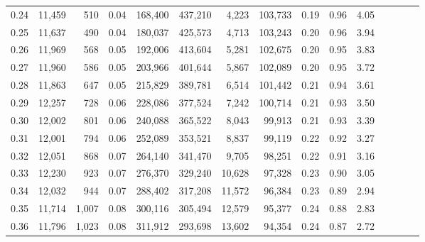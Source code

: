 \begin{tabular}{rrrcrrrrrrrrrrr}
0.24 &  11,459 &    510 &                                       0.04 &  168,400 &  437,210 &    4,223 &  103,733 &  0.19 &  0.96 &                         4.05 \\
0.25 &  11,637 &    490 &                                       0.04 &  180,037 &  425,573 &    4,713 &  103,243 &  0.20 &  0.96 &                         3.94 \\
0.26 &  11,969 &    568 &                                       0.05 &  192,006 &  413,604 &    5,281 &  102,675 &  0.20 &  0.95 &                         3.83 \\
0.27 &  11,960 &    586 &                                       0.05 &  203,966 &  401,644 &    5,867 &  102,089 &  0.20 &  0.95 &                         3.72 \\
0.28 &  11,863 &    647 &                                       0.05 &  215,829 &  389,781 &    6,514 &  101,442 &  0.21 &  0.94 &                         3.61 \\
0.29 &  12,257 &    728 &                                       0.06 &  228,086 &  377,524 &    7,242 &  100,714 &  0.21 &  0.93 &                         3.50 \\
0.30 &  12,002 &    801 &                                       0.06 &  240,088 &  365,522 &    8,043 &   99,913 &  0.21 &  0.93 &                         3.39 \\
0.31 &  12,001 &    794 &                                       0.06 &  252,089 &  353,521 &    8,837 &   99,119 &  0.22 &  0.92 &                         3.27 \\
0.32 &  12,051 &    868 &                                       0.07 &  264,140 &  341,470 &    9,705 &   98,251 &  0.22 &  0.91 &                         3.16 \\
0.33 &  12,230 &    923 &                                       0.07 &  276,370 &  329,240 &   10,628 &   97,328 &  0.23 &  0.90 &                         3.05 \\
0.34 &  12,032 &    944 &                                       0.07 &  288,402 &  317,208 &   11,572 &   96,384 &  0.23 &  0.89 &                         2.94 \\
0.35 &  11,714 &  1,007 &                                       0.08 &  300,116 &  305,494 &   12,579 &   95,377 &  0.24 &  0.88 &                         2.83 \\
0.36 &  11,796 &  1,023 &                                       0.08 &  311,912 &  293,698 &   13,602 &   94,354 &  0.24 &  0.87 &                         2.72 \\

\end{tabular}
